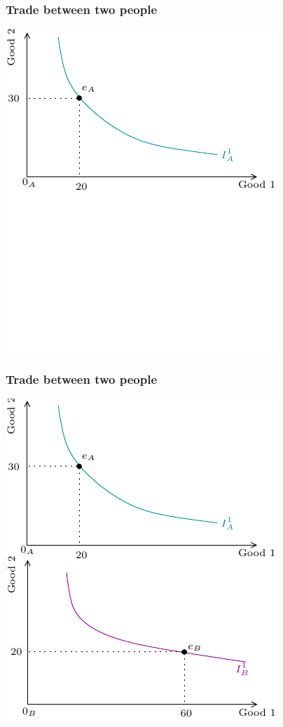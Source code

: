 \documentclass[xcolor=pdftex,dvipsnames]{beamer}
\begin{document}
\begin{frame}
\frametitle{Trade between two people}
\begin{center}
\includegraphics{pics/Edgeworth1}
\end{center}

\end{frame}


\begin{frame}
\frametitle{Trade between two people}
\begin{center}
\includegraphics{pics/Edgeworth2}
\end{center}

\end{frame}
\end{document}
